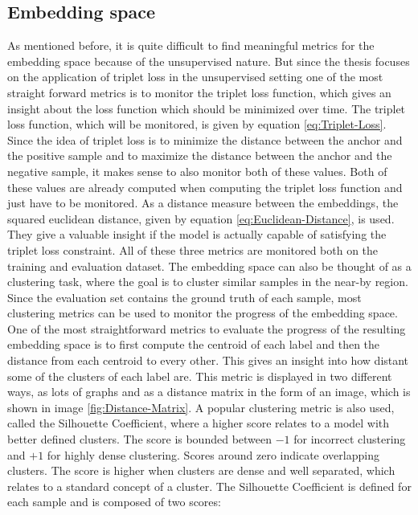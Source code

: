 \subsection{Embedding space}
\label{sub:Metrics-Embedding-Space}
As mentioned before, it is quite difficult to find meaningful metrics for the embedding space because of the unsupervised nature. But since the thesis focuses on the application of triplet loss in the unsupervised setting one of the most straight forward metrics is to monitor the triplet loss function, which gives an insight about the loss function which should be minimized over time. The triplet loss function, which will be monitored, is given by equation \ref{eq:Triplet-Loss}. Since the idea of triplet loss is to minimize the distance between the anchor and the positive sample and to maximize the distance between the anchor and the negative sample, it makes sense to also monitor both of these values. Both of these values are already computed when computing the triplet loss function and just have to be monitored. As a distance measure between the embeddings, the squared euclidean distance, given by equation \ref{eq:Euclidean-Distance}, is used. They give a valuable insight if the model is actually capable of satisfying the triplet loss constraint. All of these three metrics are monitored both on the training and evaluation dataset.
\newline
\newline
The embedding space can also be thought of as a clustering task, where the goal is to cluster similar samples in the near-by region. Since the evaluation set contains the ground truth of each sample, most clustering metrics can be used to monitor the progress of the embedding space. 
\newline
\newline
One of the most straightforward metrics to evaluate the progress of the resulting embedding space is to first compute the centroid of each label and then the distance from each centroid to every other. This gives an insight into how distant some of the clusters of each label are. This metric is displayed in two different ways, as lots of graphs and as a distance matrix in the form of an image, which is shown in image \ref{fig:Distance-Matrix}.
\newline
\newline
A popular clustering metric is also used, called the Silhouette Coefficient, where a higher score relates to a model with better defined clusters. The score is bounded between $-1$ for incorrect clustering and $+1$ for highly dense clustering. Scores around zero indicate overlapping clusters. The score is higher when clusters are dense and well separated, which relates to a standard concept of a cluster. The Silhouette Coefficient is defined for each sample and is composed of two scores:
